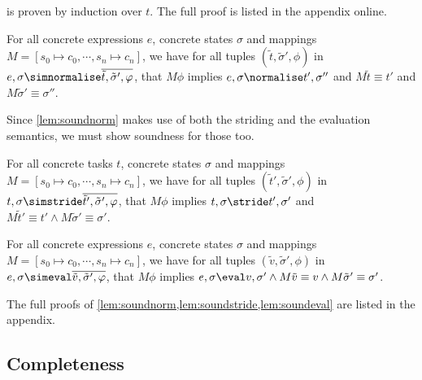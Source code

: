  is proven by induction over $t$.
The full proof is listed in the appendix online.

\begin{lemma}
  \label{lem:soundnorm}

  For all concrete expressions $e$, concrete states $\sigma$ and mappings $M=[s_0\mapsto c_0,\cdots,s_n\mapsto c_n]$,
  we have for all tuples $(\tilde{t},\tilde{\sigma}',\phi)$ in
  $e,\sigma\simnormalise \overline{\tilde{t},\tilde{\sigma}',\phi}$,
  that $M\phi$ implies
  $e,\sigma \normalise t',\sigma''$ and $M \tilde{t} \equiv t'$ and $M\tilde{\sigma}' \equiv \sigma''$.

\end{lemma}

Since \cref{lem:soundnorm} makes use of both the striding and the evaluation semantics,
we must show soundness for those too.

\begin{lemma}
  \label{lem:soundstride}
  For all concrete tasks $t$, concrete states $\sigma$ and mappings $M=[s_0\mapsto c_0,\cdots,s_n\mapsto c_n]$,
    we have for all tuples $(\tilde{t}',\tilde{\sigma}',\phi)$
    in $t,\sigma\simstride \overline{\tilde{t}',\tilde{\sigma}',\phi}$,
    that $M \phi$ implies
    $t,\sigma \stride t',\sigma'$ and $M \tilde{t}' \equiv t' \land M\tilde{\sigma}' \equiv \sigma'$.

\end{lemma}

\begin{lemma}
  \label{lem:soundeval}

  For all concrete expressions $e$, concrete sta\-tes $\sigma$ and mappings $M=[s_0\mapsto c_0,\cdots,s_n\mapsto c_n]$,
    we have for all tuples $(\tilde{v},\tilde{\sigma}',\phi)$
    in $e,\sigma\simeval \overline{\tilde{v},\tilde{\sigma}',\phi}$,
    that $M\phi$ implies
    $e,\sigma \eval v,\sigma' \land M\tilde{v} \equiv v \wedge M\tilde{\sigma}' \equiv \sigma'$.

\end{lemma}

The full proofs of \cref{lem:soundnorm,lem:soundstride,lem:soundeval} are listed in the appendix.





\subsection{Completeness}

